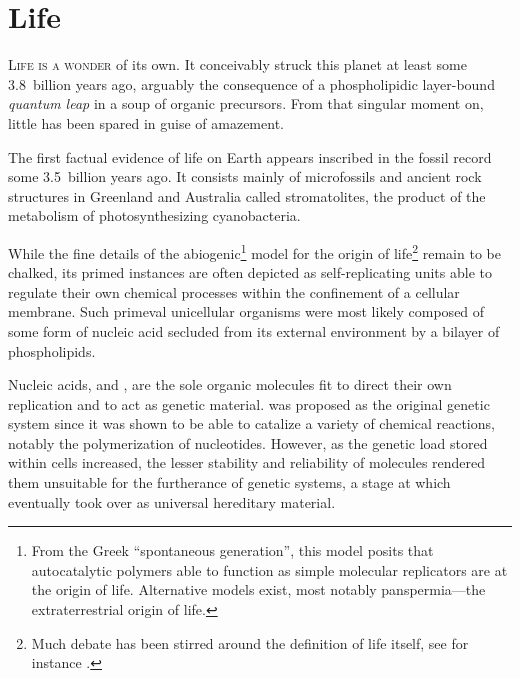 \documentclass{tufte-book}
\begin{document}
\section{Life}

\textsc{Life is a wonder} of its own.  It conceivably struck this planet at
least some 3.8~billion years ago,\cite{mojzsis_evidence_1996} arguably the
consequence of a phospholipidic \mbox{layer-bound} \emph{quantum leap} in a soup
of organic precursors.\cite{miller_organic_1959} From that singular moment on,
little has been spared in guise of amazement.\bigskip

The first factual evidence of life on Earth appears inscribed in the fossil
record some 3.5~billion years ago.  It consists mainly of microfossils and
ancient rock structures in Greenland and Australia called
stromatolites,\cite{ohtomo_evidence_2014,noffke_microbially_2013} the product of
the metabolism of photosynthesizing cyanobacteria.

While the fine details of the abiogenic\footnote{From the Greek ``spontaneous
  generation'', this model posits that autocatalytic polymers able to function
  as simple molecular replicators are at the origin of life.  Alternative models
  exist, most notably panspermia---the extraterrestrial origin of life.} model
for the origin of life\footnote{Much debate has been stirred around the
  definition of life itself, see for instance \citealp{benner_defining_2010}.}
remain to be chalked, its primed instances are often depicted as
\mbox{self-replicating} units able to regulate their own chemical processes
within the confinement of a cellular membrane.  Such primeval unicellular
organisms were most likely composed of some form of nucleic acid secluded from
its external environment by a bilayer of phospholipids.

Nucleic acids,  and , are the sole organic molecules fit
to direct their own replication and to act as genetic material.  
was proposed as the original genetic system since it was shown to be able to
catalize a variety of chemical reactions, notably the polymerization of
nucleotides.\cite{bass_specific_1984} However, as the genetic load stored within
cells increased, the lesser stability and reliability of  molecules
rendered them unsuitable for the furtherance of genetic systems, a stage at
which  eventually took over as universal hereditary material.
\end{document}
